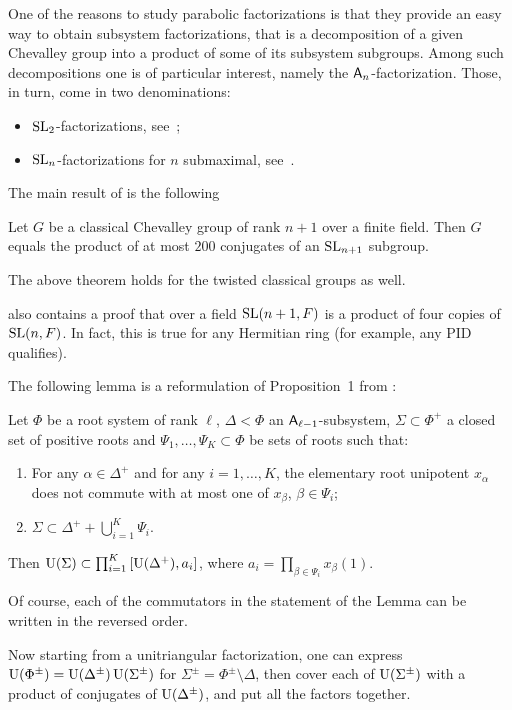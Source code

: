 One of the reasons to study parabolic factorizations is that they provide an easy way to obtain subsystem factorizations, 
that is a decomposition of a given Chevalley group into a product of some of its subsystem subgroups. 
Among such decompositions one is of particular interest, namely the $\mathsf{A}_n$-factorization. 
Those, in turn, come in two denominations:
\begin{itemize}
\item $\operatorname{SL}_2$-factorizations, see~\cite{LiebNikShaSL2,VavKovSL2};
\item $\operatorname{SL}_n$-factorizations for $n$ submaximal, see~\cite{NikProdDecomp}.
\end{itemize}
The main result of \cite{NikProdDecomp} is the following
\begin{thm*}
Let $G$ be a classical Chevalley group of rank $n+1$ over a finite field. Then $G$ equals the product of at most $200$ conjugates of an $\operatorname{SL}_{n+1}$ subgroup.
\end{thm*}
The above theorem holds for the twisted classical groups as well.

\cite{NikProdDecomp} also contains a proof that over a field $\operatorname{SL}(n+1,F)$ is a product of four copies of $\operatorname{SL}(n,F)$. In fact, this is true for any Hermitian ring (for example, any PID qualifies).

The following lemma is a reformulation of Proposition~1 from \cite{NikProdDecomp}:
\begin{lemma}
Let $\Phi$ be a root system of rank $\ell$, $\Delta<\Phi$ an $\mathsf{A}_{\ell-1}$-subsystem, $\Sigma\subset\Phi^+$ a closed set of positive roots and $\Psi_1,\ldots,\Psi_K\subset\Phi$ be sets of roots such that:
\begin{enumerate}
\item For any $\alpha\in\Delta^+$ and for any $i=1,\ldots,K$, the elementary root unipotent $x_\alpha$ does not commute with at most one of $x_\beta$, $\beta\in\Psi_i$;
\item $\Sigma\subset\Delta^++\bigcup_{i=1}^K\Psi_i$.
\end{enumerate} 
Then $\operatorname{U}(\Sigma)\subset\prod_{i=1}^{K}\left[\operatorname{U}(\Delta^+),a_i\right]$, where $a_i=\prod_{\beta\in\Psi_i}x_\beta(1)$.
\end{lemma}
Of course, each of the commutators in the statement of the Lemma can be written in the reversed order.

Now starting from a unitriangular factorization, one can express $\operatorname{U}(\Phi^\pm)=\operatorname{U}(\Delta^\pm)\operatorname{U}(\Sigma^\pm)$ for $\Sigma^\pm=\Phi^\pm\setminus\Delta$, then cover each of $\operatorname{U}(\Sigma^\pm)$ with a product of conjugates of $\operatorname{U}(\Delta^\pm)$, and put all the factors together.

